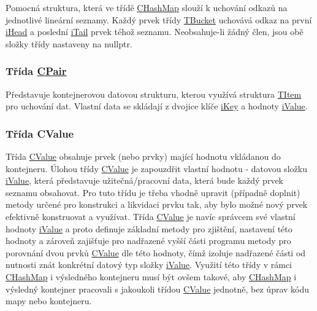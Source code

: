 Pomocná struktura, která ve třídě \hyperlink{class_c_hash_map}{C\+Hash\+Map} slouží k uchování odkazů na jednotlivé lineární seznamy. Každý prvek třídy \hyperlink{struct_c_hash_map_1_1_t_bucket}{T\+Bucket} uchovává odkaz na první \hyperlink{struct_c_hash_map_1_1_t_bucket_a03a10c5ce912fd09137778c3454e7d77}{i\+Head} a poslední \hyperlink{struct_c_hash_map_1_1_t_bucket_a1b8b634924907ed251a58eee989d577a}{i\+Tail} prvek téhož seznamu. Neobsahuje-\/li žádný člen, jsou obě složky třídy nastaveny na {\ttfamily nullptr}.

\subsubsection*{Třída \hyperlink{class_c_pair}{C\+Pair}}

Představuje kontejnerovou datovou strukturu, kterou využívá struktura \hyperlink{struct_c_hash_map_1_1_t_item}{T\+Item} pro uchování dat. Vlastní data se skládají z dvojice klíče \hyperlink{class_c_pair_a37d0dd4585094709d0536f47453a2a38}{i\+Key} a hodnoty \hyperlink{class_c_pair_a469ab54768d718dd0072d8878fd44611}{i\+Value}.

\subsubsection*{Třída C\+Value}

Třída \hyperlink{class_c_value__bool_1_1_c_value}{C\+Value} obsahuje prvek (nebo prvky) mající hodnotu vkládanou do kontejneru. Úlohou třídy \hyperlink{class_c_value__bool_1_1_c_value}{C\+Value} je zapouzdřit vlastní hodnotu -\/ datovou složku \hyperlink{class_c_value__bool_1_1_c_value_a2a05b9efee1e0497a631a39b0146b776}{i\+Value}, která představuje užitečná/pracovní data, která bude každý prvek seznamu obsahovat. Pro tuto třídu je třeba vhodně upravit (případně doplnit) metody určené pro konstrukci a likvidaci prvku tak, aby bylo možné nový prvek efektivně konstruovat a využívat. Třída \hyperlink{class_c_value__bool_1_1_c_value}{C\+Value} je navíc správcem své vlastní hodnoty \hyperlink{class_c_value__bool_1_1_c_value_a2a05b9efee1e0497a631a39b0146b776}{i\+Value} a proto definuje základní metody pro zjištění, nastavení této hodnoty a zároveň zajišťuje pro nadřazené vyšší části programu metody pro porovnání dvou prvků \hyperlink{class_c_value__bool_1_1_c_value}{C\+Value} dle této hodnoty, čímž izoluje nadřazené části od nutnosti znát konkrétní datový typ složky \hyperlink{class_c_value__bool_1_1_c_value_a2a05b9efee1e0497a631a39b0146b776}{i\+Value}. Využití této třídy v rámci \hyperlink{class_c_hash_map}{C\+Hash\+Map} i výsledného kontejneru musí být ovšem takové, aby \hyperlink{class_c_hash_map}{C\+Hash\+Map} i výsledný kontejner pracovali s jakoukoli třídou \hyperlink{class_c_value__bool_1_1_c_value}{C\+Value} jednotně, bez úprav kódu mapy nebo kontejneru.

